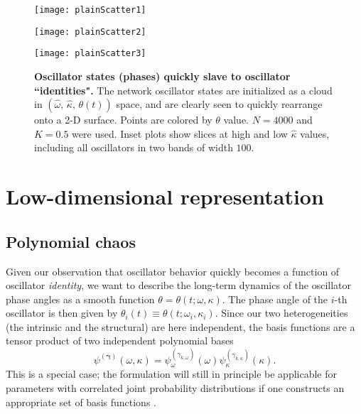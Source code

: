 \documentclass[numbers]{frontiersSCNS}
\renewcommand{\vec}[1]{\bm{#1}}
\newcommand{\degree}{\kappa}
\newcommand{\couplingK}{{K}}
\newcommand{\basisFuncSymbol}{\psi}
\newcommand{\basisFunc}[1]{\basisFuncSymbol^{(#1)}}
\newcommand{\basisFuncSubscript}[2]{\basisFuncSymbol^{(#1)}_{#2}}
\newcommand{\multiIndexCharacter}{\gamma}
\newcommand{\multiIndex}{\vec{\multiIndexCharacter}}
\newcommand{\scalarFuncIndex}{k}
\newcommand{\multiIndexA}{\multiIndexCharacter_{\scalarFuncIndex,\omega}}
\newcommand{\multiIndexB}{\multiIndexCharacter_{\scalarFuncIndex,\degree}}
\newcommand{\plainScatterKVal}{0.5}
\newcommand{\graphPlotNval}{4000}
\newcommand{\degreeSliceRadiusVal}{100}
\begin{document}
%
\setcounter{subfigure}{0}\begin{figure}[ht]
\centering
%
\begin{minipage}[b]{.32\linewidth}
    \centering
    \texttt{[image: plainScatter1]}\subcaption{}\label{fig:plainScatter1}
\end{minipage}
\begin{minipage}[b]{.32\linewidth}
    \centering
    \texttt{[image: plainScatter2]}\subcaption{}\label{fig:plainScatter2}
\end{minipage}
\begin{minipage}[b]{.32\linewidth}
    \centering
    \texttt{[image: plainScatter3]}\subcaption{}\label{fig:plainScatter3}
\end{minipage}
\caption{
    \textbf{Oscillator states (phases) quickly slave to oscillator ``identities".}
    The network oscillator states
    are initialized as a cloud in $(\hat\omega,\,\hat\degree,\,\theta(t))$ space,
    and are clearly seen to quickly rearrange onto a 2-D surface.
    Points are colored by $\theta$ value.
    $N=\graphPlotNval$ and $\couplingK=\plainScatterKVal$ were used.
    Inset plots show slices at high and low $\hat\degree$ values, including all oscillators in two bands of width $\degreeSliceRadiusVal$.
}
\label{fig:unfitSurface}
\end{figure}
%


\section{Low-dimensional representation}

\subsection{Polynomial chaos}
\label{sec:polyChaos}
Given our observation that oscillator behavior quickly becomes
a function of oscillator {\em identity}, we want to describe the long-term
dynamics of the oscillator phase angles as a smooth function $\theta=\theta(t;\omega,\degree)$.
%
The phase angle of the $i$-th oscillator is then
given by $\theta_i(t) \equiv \theta(t;\omega_i,\degree_i)$.
%
Since our two heterogeneities
(the intrinsic and the structural) are here independent,
the basis functions are a tensor product of two independent polynomial bases 
\begin{equation}
 \label{eqn:basisFuncIndependent}
    \basisFunc{\multiIndex}(\omega, \degree)=\basisFuncSubscript{\multiIndexA}{\omega}(\omega) \basisFuncSubscript{\multiIndexB}{\degree}(\degree).
\end{equation}
%
This is a special case; the formulation will still in principle be applicable for parameters
with correlated joint probability distributions if one constructs an
appropriate set of basis functions \cite{Navarro2014,Deck2015}.
%
%
%
%
\end{document}
